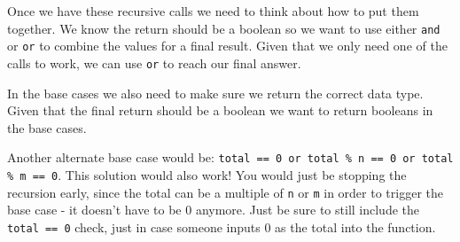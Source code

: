 \begin{blocksection}
\begin{solution}
Once we have these recursive calls we need to think about how to put them together. We know the return should be a boolean so we want to use either \lstinline{and} or \lstinline{or} to combine the values for a final result. Given that we only need one of the calls to work, we can use \lstinline{or} to reach our final answer. 

In the base cases we also need to make sure we return the correct data type. Given that the final return should be a boolean we want to return booleans in the base cases. 

Another alternate base case would be: \lstinline{total == 0 or total % n == 0 or total % m == 0}. This solution would also work! You would just be stopping the recursion early, since the total can be a multiple of \lstinline{n} or \lstinline{m} in order to trigger the base case - it doesn’t have to be 0 anymore. Just be sure to still include the \lstinline{total == 0} check, just in case someone inputs 0 as the total into the function.
\end{solution}
\end{blocksection}
